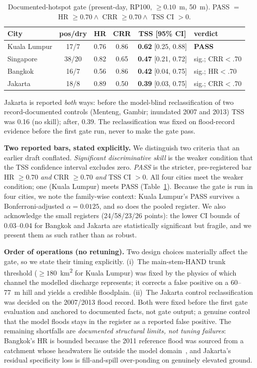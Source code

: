\documentclass[conference]{IEEEtran}
\begin{document}
\begin{table}[t]
\centering
\caption{Documented-hotspot gate (present-day, RP100, $\geq 0.10$~m, 50~m). PASS $=$ HR $\geq 0.70 \wedge$ CRR $\geq 0.70 \wedge$ TSS CI $>0$.}
\label{tab:gate}
\small
\begin{tabular}{@{}lccccl@{}}
\toprule
City & pos/dry & HR & CRR & TSS [95\% CI] & verdict \\
\midrule
Kuala Lumpur & 17/7 & 0.76 & 0.86 & \textbf{0.62} [0.25, 0.88] & \textbf{PASS} \\
Singapore    & 38/20 & 0.82 & 0.65 & \textbf{0.47} [0.21, 0.72] & sig.; CRR$<$.70 \\
Bangkok      & 16/7 & 0.56 & 0.86 & \textbf{0.42} [0.04, 0.75] & sig.; HR$<$.70 \\
Jakarta      & 18/8 & 0.89 & 0.50 & \textbf{0.39} [0.03, 0.75] & sig.; CRR$<$.70 \\
\bottomrule
\end{tabular}

\vspace{2pt}
\footnotesize
Jakarta is reported \emph{both} ways: before the model-blind reclassification of two record-documented controls (Menteng, Gambir; inundated 2007 and 2013) TSS was 0.16 (no skill); after, 0.39. The reclassification was fixed on flood-record evidence before the first gate run, never to make the gate pass.
\end{table}

\textbf{Two reported bars, stated explicitly.} We distinguish two criteria that an earlier draft conflated. \emph{Significant discriminative skill} is the weaker condition that the TSS confidence interval excludes zero. \emph{PASS} is the stricter, pre-registered bar HR $\geq 0.70$ \emph{and} CRR $\geq 0.70$ \emph{and} TSS CI $>0$. All four cities meet the weaker condition; one (Kuala Lumpur) meets PASS (Table~\ref{tab:gate}). Because the gate is run in four cities, we note the family-wise context: Kuala Lumpur's PASS survives a Bonferroni-adjusted $\alpha = 0.0125$, and so does the pooled register. We also acknowledge the small registers (24/58/23/26 points): the lower CI bounds of 0.03--0.04 for Bangkok and Jakarta are statistically significant but fragile, and we present them as such rather than as robust.

\textbf{Order of operations (no retuning).} Two design choices materially affect the gate, so we state their timing explicitly. (i)~The main-stem-HAND trunk threshold ($\geq 180$~km\textsuperscript{2} for Kuala Lumpur) was fixed by the physics of which channel the modelled discharge represents; it corrects a false positive on a 60--77~m hill and yields a credible floodplain. (ii)~The Jakarta control reclassification was decided on the 2007/2013 flood record. Both were fixed before the first gate evaluation and anchored to documented facts, not gate output; a genuine control that the model floods stays in the register as a reported false positive. The remaining shortfalls are \emph{documented structural limits, not tuning failures}: Bangkok's HR is bounded because the 2011 reference flood was sourced from a catchment whose headwaters lie outside the model domain~\cite{trinh2017}, and Jakarta's residual specificity loss is fill-and-spill over-ponding on genuinely elevated ground.
\end{document}
